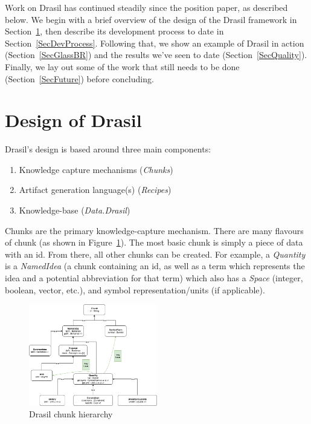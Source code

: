 \documentclass[sigconf]{acmart}
\begin{document}
Work on Drasil has continued steadily since the position paper, as described 
below. We begin with a brief overview of the design of the Drasil framework in 
Section~\ref{SecDesign}, then describe its development process to date in 
Section~\ref{SecDevProcess}. Following that, we show an example of Drasil in 
action (Section~\ref{SecGlassBR}) and the results we've seen to date 
(Section~\ref{SecQuality}). Finally, we lay out some of the work that still 
needs to be done (Section~\ref{SecFuture}) before concluding.

\section{Design of Drasil} \label{SecDesign}

Drasil's design is based around three main components:
\begin{enumerate}
	\item Knowledge capture mechanisms (\textit{Chunks})
	\item Artifact generation language(s) (\textit{Recipes})
	\item Knowledge-base (\textit{Data.Drasil})
\end{enumerate}

Chunks are the primary knowledge-capture mechanism. There are many flavours of 
chunk (as shown in Figure~\ref{hierarchy}). The most basic chunk is simply a 
piece of data with an id. From there, all other chunks can be created. For 
example, a \textit{Quantity} is a \textit{NamedIdea} (a chunk containing an id, 
as well as a term which represents the idea and a potential abbreviation for 
that term) which also has a \textit{Space} (integer, boolean, vector, etc.), 
and symbol representation/units (if applicable).

\begin{figure}
	\centering
	\includegraphics[width=0.5\textwidth]{figures/class_hierarchy.png}
	\caption{Drasil chunk hierarchy}
	\label{hierarchy}
\end{figure}
\end{document}
